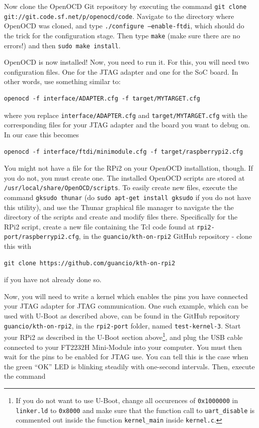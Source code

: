 \documentclass[a4paper,11pt,reqno]{amsart}
\begin{document}
{Now clone the OpenOCD Git repository by executing the command \texttt{git clone git://git.code.sf.net/p/openocd/code}. Navigate to the directory where OpenOCD was cloned, and type \texttt{./configure --enable-ftdi}, which should do the trick for the configuration stage. Then type \texttt{make} (make sure there are no errors!) and then \texttt{sudo make install}.

OpenOCD is now installed! Now, you need to run it. For this, you will need two configuration files. One for the JTAG adapter and one for the SoC board. In other words, use something similar to:

\begin{verbatim}
openocd -f interface/ADAPTER.cfg -f target/MYTARGET.cfg
\end{verbatim}

where you replace \texttt{interface/ADAPTER.cfg} and \texttt{target/MYTARGET.cfg} with the corresponding files for your JTAG adapter and the board you want to debug on. In our case this becomes

\begin{verbatim}
openocd -f interface/ftdi/minimodule.cfg -f target/raspberrypi2.cfg
\end{verbatim}

You might not have a file for the RPi2 on your OpenOCD installation, though. If you do not, you must create one. The installed OpenOCD scripts are stored at \texttt{/usr/local/share/OpenOCD/scripts}. To easily create new files, execute the command \texttt{gksudo thunar} (do \texttt{sudo apt-get install gksudo} if you do not have this utility), and use the Thunar graphical file manager to navigate the the directory of the scripts and create and modify files there. Specifically for the RPi2 script, create a new file containing the Tcl code found at \texttt{rpi2-port/raspberrypi2.cfg}, in the \texttt{guancio/kth-on-rpi2} GitHub repository - clone this with

\begin{verbatim}
git clone https://github.com/guancio/kth-on-rpi2
\end{verbatim}

if you have not already done so.

Now, you will need to write a kernel which enables the pins you have connected your JTAG adapter for JTAG communication. One such example, which can be used with U-Boot as described above, can be found in the GitHub repository \texttt{guancio/kth-on-rpi2}, in the \texttt{rpi2-port} folder, named \texttt{test-kernel-3}. Start your RPi2 as described in the U-Boot section above\footnote{If you do not want to use U-Boot, change all occurences of \texttt{0x1000000} in \texttt{linker.ld} to \texttt{0x8000} and make sure that the function call to \texttt{uart\_disable} is commented out inside the function \texttt{kernel\_main} inside \texttt{kernel.c}.}, and plug the USB cable connected to your FT2232H Mini-Module into your computer. You must then wait for the pins to be enabled for JTAG use. You can tell this is the case when the green ``OK'' LED is blinking steadily with one-second intervals. Then, execute the command

}
\end{document}
